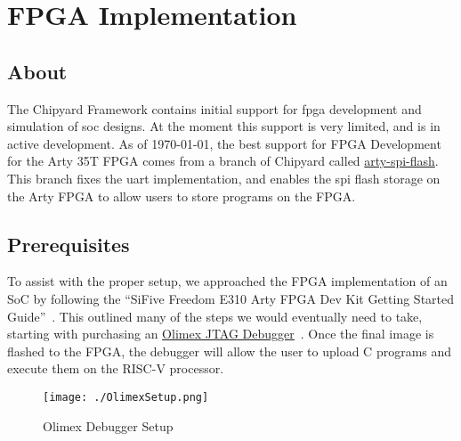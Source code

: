 \chapter{FPGA Implementation}\label{chap:FPGA_Implementation}

\section{About}\label{sec:About}
The Chipyard Framework contains initial support for \gls{fpga} development and simulation of \gls{soc} designs.
At the moment this support is very limited, and is in active development.
As of \today, the best support for FPGA Development for the Arty 35T FPGA comes from a branch of Chipyard called \href{https://github.com/ucb-bar/chipyard/tree/arty-spi-flash}{arty-spi-flash}.
This branch fixes the \gls{uart} implementation, and enables the \gls{spi} flash storage on the Arty FPGA to allow users to store programs on the FPGA.

\section{Prerequisites}\label{sec:Prerequisites}
To assist with the proper setup, we approached the FPGA implementation of an SoC by following the ``SiFive Freedom E310 Arty FPGA Dev Kit Getting Started Guide''~\cite{FreedomDevGuide}.
This outlined many of the steps we would eventually need to take, starting with purchasing an \href{https://www.digikey.com/en/products/detail/olimex-ltd/ARM-USB-TINY-H/3471388}{Olimex JTAG Debugger}~\cite{OlimexJTAG}.
Once the final image is flashed to the FPGA, the debugger will allow the user to upload C programs and execute them on the RISC-V processor.

\begin{figure}[h!tbp]
  \centering
  \texttt{[image: ./OlimexSetup.png]}
  \caption{Olimex Debugger Setup~\cite[p.~5]{FreedomDevGuide}}
  \label{fig:olimexsetup}
\end{figure}

